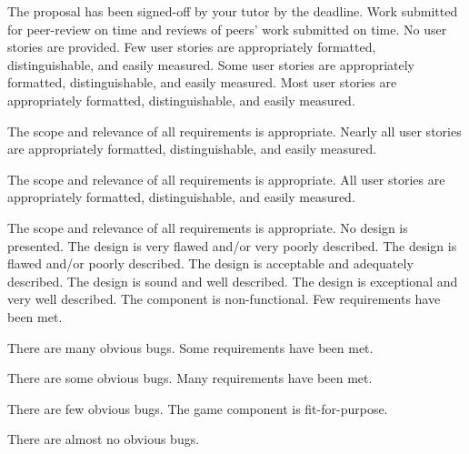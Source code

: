 \documentclass{../fal_assignment}
\begin{document}
\begin{markingrubric}
%
        \grade 		The proposal has been signed-off by your tutor by the deadline.
%
        \grade 		Work submitted for peer-review on time and reviews of peers' work submitted on time.
%
        \grade\fail 	No user stories are provided.
        \grade 		Few user stories are appropriately formatted, distinguishable, and easily measured.
        \grade 		Some user stories are appropriately formatted, distinguishable, and easily measured.
        \grade 		Most user stories are appropriately formatted, distinguishable, and easily measured.
        \par 		The scope and relevance of all requirements is appropriate.
        \grade 		Nearly all user stories are appropriately formatted, distinguishable, and easily measured.
        \par 		The scope and relevance of all requirements is appropriate.
        \grade 		All user stories are appropriately formatted, distinguishable, and easily measured.
        \par 		The scope and relevance of all requirements is appropriate.
%
        \grade\fail 	No design is presented.
        \grade 		The design is very flawed and/or very poorly described.
        \grade 		The design is flawed and/or poorly described.
        \grade 		The design is acceptable and adequately described.
        \grade 		The design is sound and well described.
        \grade 		The design is exceptional and very well described.
%
        \grade\fail 	The component is non-functional.
        \grade 		Few requirements have been met.
        \par 		There are many obvious bugs.
        \grade 		Some requirements have been met.
        \par 		There are some obvious bugs.
        \grade 		Many requirements have been met.
        \par 		There are few obvious bugs.
        \grade 		The game component is fit-for-purpose.
        \par 		There are almost no obvious bugs.

\end{markingrubric}
\end{document}
